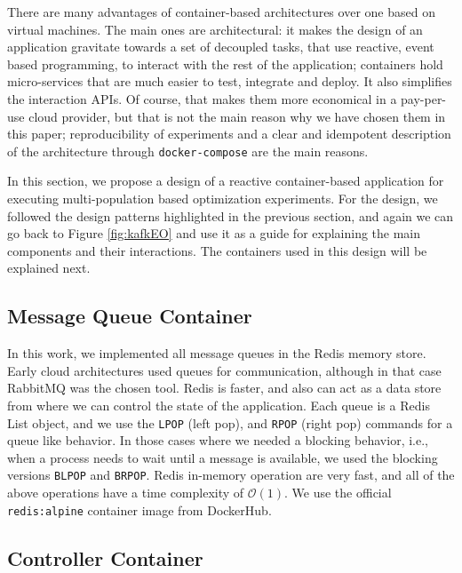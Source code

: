 \documentclass[review]{elsarticle}
\begin{document}
There are many advantages of container-based architectures over one
based on virtual machines. The main ones are architectural: it makes
the design of an application gravitate towards a set of decoupled
tasks, that use reactive, event based programming, to interact with
the rest of the application; containers hold micro-services that are
much easier to test, integrate and deploy. It also simplifies
the interaction APIs. Of course, that makes them more economical in a
pay-per-use cloud provider, but that is not the main reason why we
have chosen them in this paper; reproducibility of experiments and a
clear and idempotent description of the architecture through {\tt docker-compose} 
are the main reasons. 

In this section, we propose a design of a reactive container-based application
for executing multi-population based optimization experiments.  For the design,
we followed the design patterns highlighted in the previous section, and again
we can go back to Figure \ref{fig:kafkEO} and use it as a guide for explaining
the main components and their interactions. The containers used in this design will be explained next. 

\subsection{Message Queue Container} 
\label{message_container}

In this work, we implemented all message
queues in the Redis memory store. Early cloud architectures
\cite{de2017parallel} used queues for communication, although in that
case RabbitMQ was the chosen tool. Redis is faster, and also can act
as a data store from where we can control the state of the application.
Each queue is a Redis List object, and we use
the \texttt{LPOP} (left pop), and \texttt{RPOP} (right pop) commands for a queue like behavior.
In those cases where we needed a blocking behavior, i.e., when a process needs
to wait until a message is available, we used the blocking versions \texttt{BLPOP} and
\texttt{BRPOP}. Redis in-memory operation are very fast, and all of the above 
operations have a time complexity of $\mathcal{O}(1)$. We use the official 
\texttt{redis:alpine} container image from DockerHub.  

\subsection{Controller Container} 
\label{controller}
\end{document}
